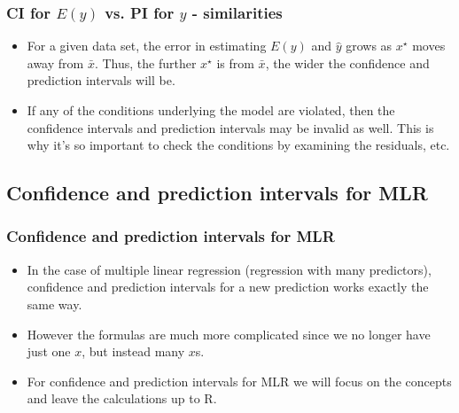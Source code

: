 \documentclass[11pt,containsverbatim,handout,xcolor=xelatex,dvipsnames,table]{beamer}
\begin{document}

\begin{frame}
\frametitle{CI for $E(y)$ vs. PI for $y$ - similarities}

\begin{itemize}

\item For a given data set, the error in estimating $E(y)$ and $\hat{y}$ grows as $x^\star$ moves away from $\bar{x}$. Thus, the further $x^\star$ is from $\bar{x}$, the wider the confidence and prediction intervals will be.

\pause

\item If any of the conditions underlying the model are violated, then the confidence intervals and prediction intervals may be invalid as well. This is why it's so important to check the conditions by examining the residuals, etc.

\end{itemize}

\end{frame}


\subsection{Confidence and prediction intervals for MLR}


\begin{frame}
\frametitle{Confidence and prediction intervals for MLR}

\begin{itemize}

\item In the case of multiple linear regression (regression with many predictors), confidence and prediction intervals for a new prediction works exactly the same way.

\item However the formulas are much more complicated since we no longer have just one $x$, but instead many $x$s.

\item For confidence and prediction intervals for MLR we will focus on the concepts and leave the calculations up to R.

\end{itemize}

\end{frame}
\end{document}
